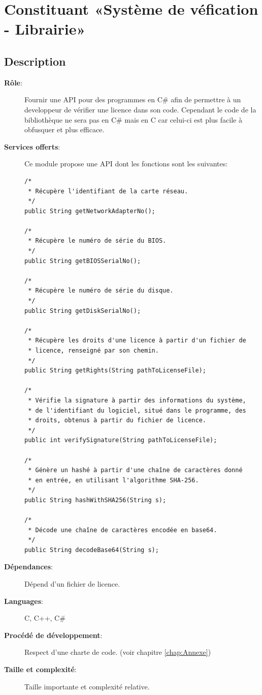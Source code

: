 \section{Constituant «Système de véfication - Librairie»}
\subsection{Description}
\begin{description}
	\item[\textbf{Rôle}:]
		Fournir une API pour des programmes en C\# afin de 
		permettre à un developpeur de vérifier une licence dans son code.
        Cependant le code de la bibliothèque ne sera pas en C\# mais en 
        C car celui-ci est plus facile à obfusquer et plus efficace. 

	\newpage

	\item[\textbf{Services offerts}:]
		Ce module propose une API dont les fonctions sont les suivantes:
		\begin{verbatim}
/*
 * Récupère l'identifiant de la carte réseau.
 */
public String getNetworkAdapterNo();

/*
 * Récupère le numéro de série du BIOS.
 */
public String getBIOSSerialNo();

/*
 * Récupère le numéro de série du disque.
 */
public String getDiskSerialNo();

/*
 * Récupère les droits d'une licence à partir d'un fichier de
 * licence, renseigné par son chemin.
 */
public String getRights(String pathToLicenseFile);

/*
 * Vérifie la signature à partir des informations du système,
 * de l'identifiant du logiciel, situé dans le programme, des
 * droits, obtenus à partir du fichier de licence.
 */
public int verifySignature(String pathToLicenseFile);

/*
 * Génère un hashé à partir d'une chaîne de caractères donné
 * en entrée, en utilisant l'algorithme SHA-256.
 */
public String hashWithSHA256(String s);

/*
 * Décode une chaîne de caractères encodée en base64.
 */
public String decodeBase64(String s);
			\end{verbatim}

	\item[\textbf{Dépendances}:]
		Dépend d'un fichier de licence.	
	\item[\textbf{Languages}:]
		C, C++, C\#
	\item[\textbf{Procédé de développement}:]
		Respect d'une charte de code. (voir chapitre \ref{chap:Annexe})
	\item[\textbf{Taille et complexité}:]
		Taille importante et complexité relative.
\end{description}

